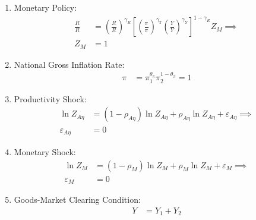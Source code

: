 \documentclass[../thesis.tex]{subfiles}
\begin{document}
\begin{enumerate}
\begin{comment}
	\end{comment}
	
	\item Monetary Policy:
	\begin{align}
		\frac{R_{}}{R_{}} &= \left( \frac{R_{}}{R_{}} \right)^{\gamma_{R}} \left[ \left( \frac{\pi_{}}{\pi_{}} \right)^{\gamma_{\pi}} \left( \frac{Y_{}}{Y_{}} \right)^{\gamma_{Y}} \right]^{1-\gamma_{R}} Z_{M} \implies \nonumber \\
		Z_{M} &= 1 \label{ext-mod:reg-ss-monetary-policy}
	\end{align}
	
	\item National Gross Inflation Rate:
	\begin{align}
		\pi_{} &= \pi_{1}^{\theta_{\pi}} \pi_{2}^{1 - \theta_{\pi}} = 1 \label{ext-mod:reg-ss-gross-inflation-rate}
	\end{align}
	
	\begin{comment}
		\item National Price Level:
		\begin{align}
			P_{} &= \frac{P_{1} Y_{1} + P_{2} Y_{2}}{Y_{}} \label{ext-mod:reg-ss-national-price-level} %
		\end{align}	
	\end{comment}
	
	\item Productivity Shock:
	\begin{align}
		\ln{Z_{A\eta}} &= (1-\rho_{A\eta}) \ln{Z_{A\eta}} + \rho_{A\eta} \ln{Z_{A\eta}} + \varepsilon_{A\eta} \implies \nonumber \\
		\varepsilon_{A\eta} &= 0 \label{ext-mod:reg-ss-productivity-shock}
	\end{align}
	
	\item Monetary Shock:
	\begin{align}
		\ln{Z_{M}} &= (1-\rho_M) \ln{Z_{M}} + \rho_M \ln{Z_{M}} + \varepsilon_{M} \implies \nonumber \\
		\varepsilon_{M} &= 0 \label{ext-mod:reg-ss-monetary-shock}
	\end{align}
	
	\item Goods-Market Clearing Condition:
	\begin{align}
		Y_{} &= Y_{1} + Y_{2} \label{ext-mod:reg-ss-market-clearing-condition-Yt}
	\end{align}
	

\end{enumerate}
\end{document}
